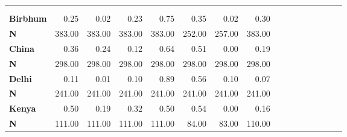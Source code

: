 \begin{tabular}{@{\extracolsep{5pt}}lrrrrrrrrrrrrrrr}
\toprule
&  &  &  &  &  &  &  \\
{\bf } &  &  &  &  &  &  &  \\
\hline
{\bf Birbhum} & 0.25\phantom{***} & 0.02\phantom{***} & 0.23\phantom{***} & 0.75\phantom{***} & 0.35\phantom{***} & 0.02\phantom{***} & 0.30\phantom{***} \\
{\bf N} & 383.00\phantom{***} & 383.00\phantom{***} & 383.00\phantom{***} & 383.00\phantom{***} & 252.00\phantom{***} & 257.00\phantom{***} & 383.00\phantom{***} \\
{\bf China} & 0.36\phantom{***} & 0.24\phantom{***} & 0.12\phantom{***} & 0.64\phantom{***} & 0.51\phantom{***} & 0.00\phantom{***} & 0.19\phantom{***} \\
{\bf N} & 298.00\phantom{***} & 298.00\phantom{***} & 298.00\phantom{***} & 298.00\phantom{***} & 298.00\phantom{***} & 298.00\phantom{***} & 298.00\phantom{***} \\
{\bf Delhi} & 0.11\phantom{***} & 0.01\phantom{***} & 0.10\phantom{***} & 0.89\phantom{***} & 0.56\phantom{***} & 0.10\phantom{***} & 0.07\phantom{***} \\
{\bf N} & 241.00\phantom{***} & 241.00\phantom{***} & 241.00\phantom{***} & 241.00\phantom{***} & 241.00\phantom{***} & 241.00\phantom{***} & 241.00\phantom{***} \\
{\bf Kenya} & 0.50\phantom{***} & 0.19\phantom{***} & 0.32\phantom{***} & 0.50\phantom{***} & 0.54\phantom{***} & 0.00\phantom{***} & 0.16\phantom{***} \\
{\bf N} & 111.00\phantom{***} & 111.00\phantom{***} & 111.00\phantom{***} & 111.00\phantom{***} & 84.00\phantom{***} & 83.00\phantom{***} & 110.00\phantom{***} \\

\end{tabular}
